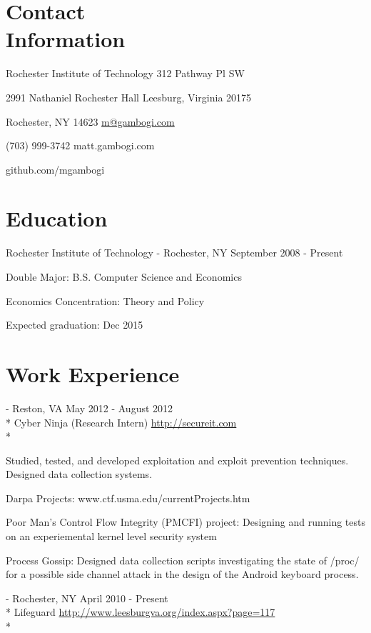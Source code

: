 \documentclass[letter,margin,line]{resume}
\newcommand{\rurl}[1]{\hfill {\footnotesize \url{#1}}}
\newcommand{\rdate}[1]{\hfill {\small #1}}
\renewcommand{\employer}[5]{\item[#1] - #2 \rdate{#3} \\* #4 \rurl{#5} \\*}
\begin{document}
\begin{resume}
\section{\mysidestyle Contact \\ Information} \vspace{2mm}
	\begin{asparablank}
		\item Rochester Institute of Technology \hfill 312 Pathway Pl SW
		\item 2991 Nathaniel Rochester Hall \hfill Leesburg, Virginia 20175
		\item Rochester, NY 14623 \hfill
		\href{mailto:m@gambogi.com}{m@gambogi.com}
		\item (703) 999-3742 \hfill {matt.gambogi.com}
		\item \hfill github.com/mgambogi
	\end{asparablank}

\section{\mysidestyle Education}
	\begin{compactdesc}
		\item[Rochester Institute of Technology] - Rochester, NY \rdate{September 2008 - Present}
		\begin{compactitem} { \small
			\item Double Major: B.S. Computer Science and Economics 
			\item Economics Concentration: Theory and Policy
			\item Expected graduation: Dec 2015
		} \end{compactitem}
	\end{compactdesc}

\section{\mysidestyle Work Experience}
	\begin{asparadesc}
		\employer{SecureIT}{Reston, VA}{May 2012 - August 2012}{Cyber Ninja (Research Intern)}{http://secureit.com}

		\small
		Studied, tested, and developed exploitation and exploit prevention techniques. Designed data collection systems.
		\item Darpa Projects: \hfill www.ctf.usma.edu/currentProjects.htm
			\item Poor Man’s Control Flow Integrity (PMCFI) project: Designing and running tests on an experiemental kernel level security system
			\item Process Gossip: Designed data collection scripts investigating the state of /proc/ for a possible side channel attack in the design of the Android keyboard process.
		\normalsize
		\\
        \employer{Town of Leesburg, Parks and Recreation}{Rochester, NY}{April 2010 - Present}{Lifeguard}{http://www.leesburgva.org/index.aspx?page=117}


\end{asparadesc}
\end{resume}
\end{document}
